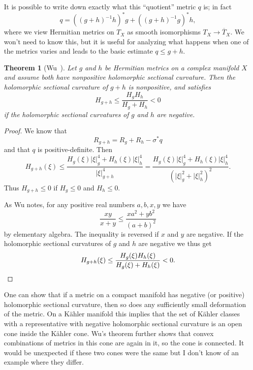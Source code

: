 \documentclass[10pt,a4paper]{amsart}
\newtheorem{theo}{Theorem}
\def\ov#1{\overline{#1}}
\begin{document}
It is possible to write down exactly what this ``quotient'' metric $q$ is; in fact
\[
q = ((g+h)^{-1}h)^*g
+ ((g+h)^{-1}g)^*h,
\]
where we view Hermitian metrics on $T_X$ as smooth isomorphisms $T_X \to
\ov{T}_X$. We won't need to know this, but it is useful for analyzing what
happens when one of the metrics varies and leads to the basic estimate $q \leq g
+ h$.



\begin{theo}[Wu~\cite{wu1973remark}]
Let $g$ and $h$ be Hermitian metrics on a complex manifold $X$ and assume both
have nonpositive holomorphic sectional curvature.
Then the holomorphic sectional curvature of $g + h$ is nonpositive, and satisfies
\[
H_{g + h} \leq \frac{H_g H_h}{H_g + H_h} < 0
\]
if the holomorphic sectional curvatures of $g$ and $h$ are negative.
\end{theo}

\begin{proof}
We know that
\[
R_{g + h} = R_g + R_h - \sigma^* q
\]
and that $q$ is positive-definite.
Then
\[
H_{g+h}(\xi)
\leq \frac{H_g(\xi) |\xi|^4_g + H_h(\xi) |\xi|^4_h}{|\xi|^4_{g + h}}
= \frac{H_g(\xi) |\xi|^4_g + H_h(\xi) |\xi|^4_h}{(|\xi|^2_{g} + |\xi|^2_h)^2}.
\]
Thus $H_{g + h} \leq 0$ if $H_g \leq 0$ and $H_h \leq 0$.

As Wu notes,
for any positive real numbers $a, b, x, y$ we have
\[
\frac{xy}{x + y} \leq \frac{x a^2 + y b^2}{(a + b)^2}
\]
by elementary algebra.
The inequality is reversed if $x$ and $y$ are negative.
If the holomorphic sectional curvatures of $g$ and $h$ are negative we thus get
\[
H_{g + h}(\xi) \leq \frac{H_g(\xi) H_h(\xi)}{H_g(\xi) + H_h(\xi)} < 0.
\qedhere
\]
\end{proof}


One can show that if a metric on a compact manifold has negative (or positive)
holomorphic sectional curvature, then so does any sufficiently small
deformation of the metric.
On a K\"ahler manifold this implies that the set of K\"ahler classes with a
representative with negative holomorphic sectional curvature is an open cone
inside the K\"ahler cone.
Wu's theorem further shows that convex combinations of metrics in this cone are
again in it, so the cone is connected.
It would be unexpected if these two cones were the same but I don't know of an
example where they differ.





\end{document}
